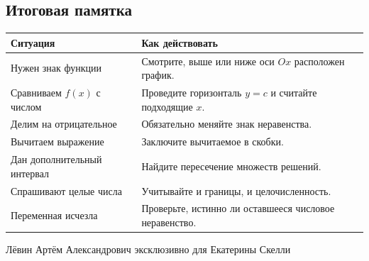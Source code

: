 \documentclass[a4paper,12pt]{article}
\begin{document}
\subsection*{Итоговая памятка}
\renewcommand{\arraystretch}{1.3}
\begin{tabularx}{\linewidth}{@{}p{.37\linewidth}X@{}}
\toprule
\textbf{Ситуация}&\textbf{Как действовать}\\
\midrule
Нужен знак функции & Смотрите, выше или ниже оси $Ox$ расположен график.\\
Сравниваем $f(x)$ с числом & Проведите горизонталь $y=c$ и считайте подходящие $x$.\\
Делим на отрицательное & Обязательно меняйте знак неравенства.\\
Вычитаем выражение & Заключите вычитаемое в скобки.\\
Дан дополнительный интервал & Найдите пересечение множеств решений.\\
Спрашивают целые числа & Учитывайте и границы, и целочисленность.\\
Переменная исчезла & Проверьте, истинно ли оставшееся числовое неравенство.\\
\bottomrule
\end{tabularx}
\vfill
\begin{center}
\small\color{muted}Лёвин Артём Александрович эксклюзивно для Екатерины Скелли
\end{center}
\end{document}
